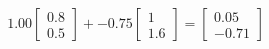 \documentclass[preview]{standalone}
\begin{document}
\begin{align*}
1.00 \begin{bmatrix} 0.8 \\ 0.5 \end{bmatrix} + -0.75 \begin{bmatrix} 1 \\ 1.6 \end{bmatrix} = \begin{bmatrix} 0.05 \\ -0.71 \end{bmatrix}
\end{align*}
\end{document}
